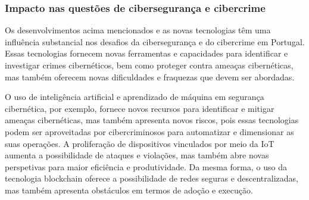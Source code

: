 \subsubsection{Impacto nas questões de cibersegurança e cibercrime}

Os desenvolvimentos acima mencionados e as novas tecnologias têm uma influência substancial nos desafios da cibersegurança e do cibercrime em Portugal. Essas tecnologias fornecem novas ferramentas e capacidades para identificar e investigar crimes cibernéticos, bem como proteger contra ameaças cibernéticas, mas também oferecem novas dificuldades e fraquezas que devem ser abordadas.

O uso de inteligência artificial e aprendizado de máquina em segurança cibernética, por exemplo, fornece novos recursos para identificar e mitigar ameaças cibernéticas, mas também apresenta novos riscos, pois essas tecnologias podem ser aproveitadas por cibercriminosos para automatizar e dimensionar as suas operações. A proliferação de dispositivos vinculados por meio da IoT aumenta a possibilidade de ataques e violações, mas também abre novas perspetivas para maior eficiência e produtividade. Da mesma forma, o uso da tecnologia blockchain oferece a possibilidade de redes seguras e descentralizadas, mas também apresenta obstáculos em termos de adoção e execução.
